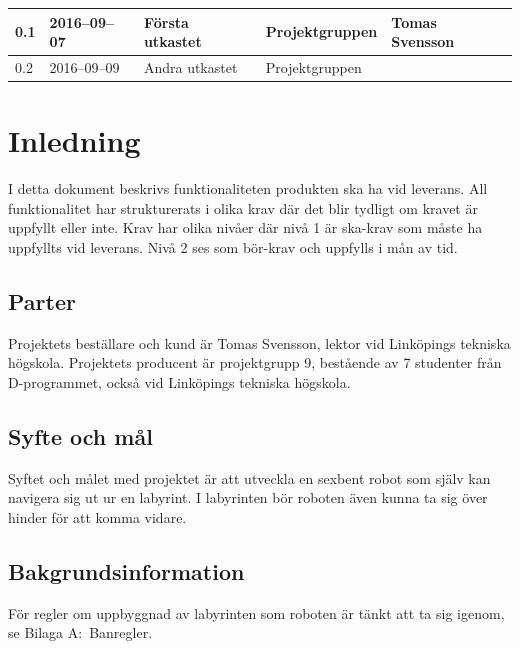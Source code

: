 \documentclass[a4paper,titlepage,12pt]{article}
\begin{document}
\begin{center}
\begin{table}[h]
\begin{tabular}[pos]{ l l l l l }
				0.1 & 2016--09--07 & Första utkastet & Projektgruppen & Tomas Svensson \\ \midrule
				0.2  & 2016--09--09 & Andra utkastet & Projektgruppen & \\

			\end{tabular}
		\end{table}

	\end{center}


	\newpage

	\section{Inledning}
	I detta dokument beskrivs funktionaliteten produkten ska ha vid leverans. All funktionalitet har strukturerats i olika krav där det 
	blir tydligt om kravet är uppfyllt eller inte. Krav har olika nivåer där
	nivå 1 är ska-krav som måste ha uppfyllts vid leverans. Nivå 2 ses som bör-krav 
	och uppfylls i mån av tid.

	\subsection{Parter}
	Projektets beställare och kund är Tomas Svensson, lektor vid Linköpings tekniska högskola.
	Projektets producent är projektgrupp 9, bestående av 7 studenter från D-programmet, också vid 
	Linköpings tekniska högskola.
	\subsection{Syfte och mål}
	Syftet och målet med projektet är att utveckla en sexbent robot som själv
	kan navigera sig ut ur en labyrint. I labyrinten bör roboten även kunna ta 
	sig över hinder för att komma vidare. 
	\subsection{Bakgrundsinformation}
	För regler om uppbyggnad av labyrinten som roboten är tänkt att ta sig igenom, se
	Bilaga A:\ Banregler.

\end{document}
